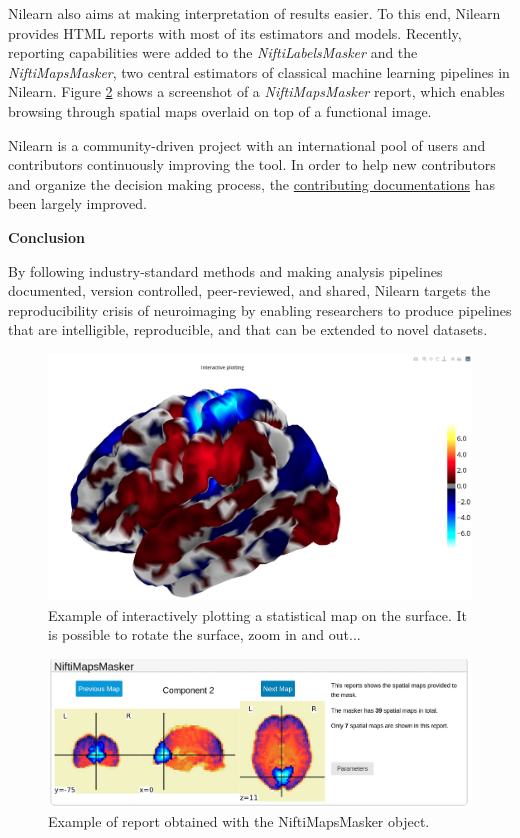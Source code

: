 \documentclass[a4paper]{article}
\begin{document}
\medskip

\noindent Nilearn also aims at making interpretation of results easier. To this end, Nilearn provides HTML reports with most of its estimators and models. Recently, reporting capabilities were added to the \textit{NiftiLabelsMasker} and the \textit{NiftiMapsMasker}, two central estimators of classical machine learning pipelines in Nilearn. Figure \ref{fig:figure_2} shows a screenshot of a \textit{NiftiMapsMasker} report, which enables browsing through spatial maps overlaid on top of a functional image.

\medskip

\noindent Nilearn is a community-driven project with an international pool of users and contributors continuously improving the tool. In order to help new contributors and organize the decision making process, the \href{https://nilearn.github.io/dev/development.html}{contributing documentations} has been largely improved.


\bigskip

\noindent \textbf{Conclusion}

\medskip

\noindent By following industry-standard methods and making analysis pipelines documented, version controlled, peer-reviewed, and shared, Nilearn targets the reproducibility crisis of neuroimaging by enabling researchers to produce pipelines that are intelligible, reproducible, and that can be extended to novel datasets.

\newpage


\begin{figure}[htp]
	\centering
	\includegraphics[scale=.25]{./figure_1}
	\caption{Example of interactively plotting a statistical map on the surface. It is possible to rotate the surface, zoom in and out...}
	\label{fig:figure_1}
\end{figure}

\begin{figure}[hbp]
	\centering
	\includegraphics[scale=.33]{./figure_2}
	\caption{Example of report obtained with the NiftiMapsMasker object.}
	\label{fig:figure_2}
\end{figure}

\newpage

 

\end{document}
